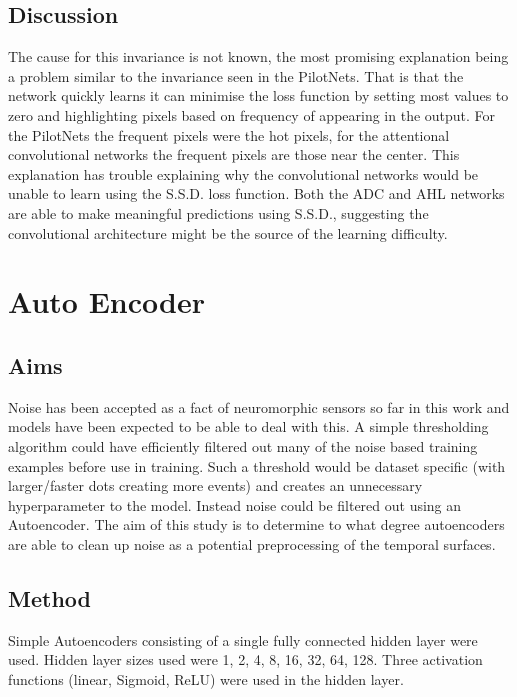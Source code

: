 \subsection{Discussion}
The cause for this invariance is not known, the most promising explanation being a problem similar to the invariance seen in the PilotNets.
That is that the network quickly learns it can minimise the loss function by setting most values to zero and highlighting pixels based on frequency of appearing in the output.
For the PilotNets the frequent pixels were the hot pixels, for the attentional convolutional networks the frequent pixels are those near the center.
This explanation has trouble explaining why the convolutional networks would be unable to learn using the S.S.D. loss function.
Both the ADC and AHL networks are able to make meaningful predictions using S.S.D., suggesting the convolutional architecture might be the source of the learning difficulty.

\section{Auto Encoder}
\subsection{Aims}
Noise has been accepted as a fact of neuromorphic sensors so far in this work and models have been expected to be able to deal with this.
A simple thresholding algorithm could have efficiently filtered out many of the noise based training examples before use in training. 
Such a threshold would be dataset specific (with larger/faster dots creating more events) and creates an unnecessary hyperparameter to the model. 
Instead noise could be filtered out using an Autoencoder.
The aim of this study is to determine to what degree autoencoders are able to clean up noise as a potential preprocessing of the temporal surfaces.

\subsection{Method}
Simple Autoencoders consisting of a single fully connected hidden layer were used.
Hidden layer sizes used were 1, 2, 4, 8, 16, 32, 64, 128. 
Three activation functions (linear, Sigmoid, ReLU) were used in the hidden layer.   

